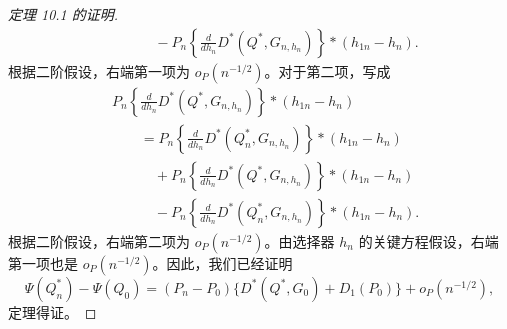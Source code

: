\begin{proof}[定理 10.1 的证明]
\[\begin{aligned}
 &\qquad\quad{}-P_n\left\{\frac{d}{dh_n}D^*(Q^*,G_{n,h_n})\right\}
        \ast(h_{1n}-h_n).
 \end{aligned}
\]
根据二阶假设，右端第一项为 $o_P(n^{-1/2})$。对于第二项，写成
\[
 \begin{aligned}
 &P_n\left\{\frac{d}{dh_n}D^*(Q^*,G_{n,h_n})\right\}
        \ast(h_{1n}-h_n)\\
 &\qquad=P_n\left\{\frac{d}{dh_n}D^*(Q_n^*,G_{n,h_n})\right\}
        \ast(h_{1n}-h_n)\\
 &\qquad\quad{}+P_n\left\{\frac{d}{dh_n}D^*(Q^*,G_{n,h_n})\right\}
        \ast(h_{1n}-h_n)\\
 &\qquad\quad{}-P_n\left\{\frac{d}{dh_n}D^*(Q_n^*,G_{n,h_n})\right\}
        \ast(h_{1n}-h_n).
 \end{aligned}
\]
根据二阶假设，右端第二项为 $o_P(n^{-1/2})$。由选择器 $h_n$ 的关键方程假设，右端第一项也是 $o_P(n^{-1/2})$。因此，我们已经证明
\[
 \Psi(Q_n^*)-\Psi(Q_0)
 =(P_n-P_0)\{D^*(Q^*,G_0)+D_1(P_0)\}+o_P(n^{-1/2}),
\]
定理得证。
\end{proof}

